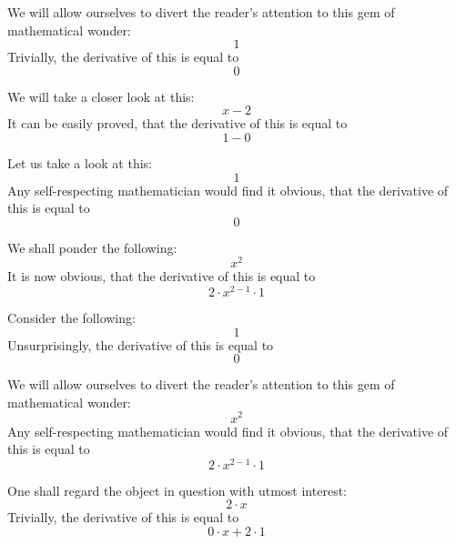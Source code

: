 \documentclass{article}
\begin{document}
We will allow ourselves to divert the reader's attention to this gem of mathematical wonder:
\begin{equation}
1 
\end{equation}
Trivially, the derivative of this is equal to
\begin{equation}
0 
\end{equation}

We will take a closer look at this:
\begin{equation}
x - 2 
\end{equation}
It can be easily proved, that the derivative of this is equal to
\begin{equation}
1 - 0 
\end{equation}

Let us take a look at this:
\begin{equation}
1 
\end{equation}
Any self-respecting mathematician would find it obvious, that the derivative of this is equal to
\begin{equation}
0 
\end{equation}

We shall ponder the following:
\begin{equation}
x ^{2 } 
\end{equation}
It is now obvious, that the derivative of this is equal to
\begin{equation}
2 \cdot x ^{2 - 1 } \cdot 1 
\end{equation}

Consider the following:
\begin{equation}
1 
\end{equation}
Unsurprisingly, the derivative of this is equal to
\begin{equation}
0 
\end{equation}

We will allow ourselves to divert the reader's attention to this gem of mathematical wonder:
\begin{equation}
x ^{2 } 
\end{equation}
Any self-respecting mathematician would find it obvious, that the derivative of this is equal to
\begin{equation}
2 \cdot x ^{2 - 1 } \cdot 1 
\end{equation}

One shall regard the object in question with utmost interest:
\begin{equation}
2 \cdot x 
\end{equation}
Trivially, the derivative of this is equal to
\begin{equation}
0 \cdot x + 2 \cdot 1 
\end{equation}
\end{document}
